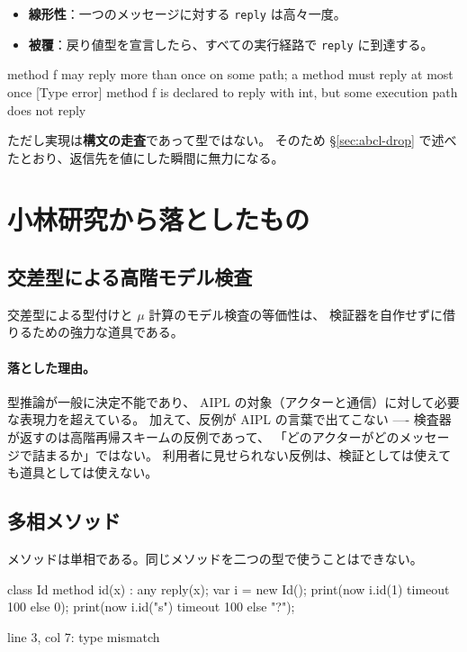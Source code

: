 \documentclass[11pt,a4paper]{ltjsarticle}
\theoremstyle{definition}
\theoremstyle{remark}
\begin{document}
\begin{itemize}
\item \textbf{線形性}：一つのメッセージに対する \texttt{reply} は高々一度。
\item \textbf{被覆}：戻り値型を宣言したら、すべての実行経路で \texttt{reply} に到達する。
\end{itemize}

\begin{term}
 method f may reply more than once on some path;
             a method must reply at most once
[Type error] method f is declared to reply with int,
             but some execution path does not reply
\end{term}

ただし実現は\textbf{構文の走査}であって型ではない。
そのため \S\ref{sec:abcl-drop} で述べたとおり、返信先を値にした瞬間に無力になる。

\section{小林研究から落としたもの}
\label{sec:koba-drop}

\subsection{交差型による高階モデル検査}

交差型による型付けと $\mu$ 計算のモデル検査の等価性は、
検証器を自作せずに借りるための強力な道具である。

\paragraph{落とした理由。}
型推論が一般に決定不能であり、
AIPL の対象（アクターと通信）に対して必要な表現力を超えている。
加えて、反例が AIPL の言葉で出てこない ----
検査器が返すのは高階再帰スキームの反例であって、
「どのアクターがどのメッセージで詰まるか」ではない。
利用者に見せられない反例は、検証としては使えても道具としては使えない。

\subsection{多相メソッド}

メソッドは単相である。同じメソッドを二つの型で使うことはできない。

\begin{aipl}
class Id { method id(x) : any { reply(x); } }
var i = new Id();
print(now i.id(1) timeout 100 else 0);
print(now i.id("s") timeout 100 else "?");
\end{aipl}
\begin{term}
 line 3, col 7: type mismatch
\end{term}
\end{document}

